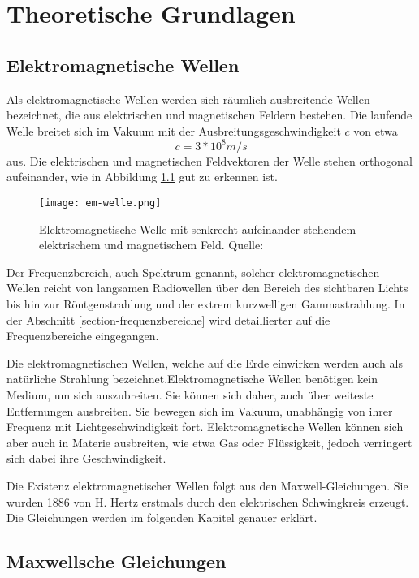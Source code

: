 
\chapter{Theoretische Grundlagen}
\section{Elektromagnetische Wellen}
Als elektromagnetische Wellen werden sich räumlich ausbreitende Wellen bezeichnet, die aus elektrischen und magnetischen Feldern bestehen. Die laufende Welle breitet sich im Vakuum mit der Ausbreitungsgeschwindigkeit \(c\) von etwa \[c= 3*10^8 m/s\] aus. Die elektrischen und magnetischen Feldvektoren der Welle stehen orthogonal aufeinander, wie in Abbildung \ref{elektromagnetische Welle} gut zu erkennen ist.

\begin{figure}[ht]
	\centering
	\texttt{[image: em-welle.png]}
	\caption[Elektromagnetische Welle mit senkrecht
	aufeinander stehendem elektrischem und magnetischem Feld]{Elektromagnetische Welle mit senkrecht aufeinander stehendem elektrischem und magnetischem Feld. Quelle: \cite[Harten, S. 130]{Harten:2017}} 
	\label{elektromagnetische Welle}
\end{figure}

Der Frequenzbereich, auch Spektrum genannt, solcher elektromagnetischen Wellen reicht von langsamen Radiowellen über den Bereich des sichtbaren Lichts bis hin zur Röntgenstrahlung und der extrem kurzwelligen Gammastrahlung. In der Abschnitt \ref{section-frequenzbereiche} wird detaillierter auf die Frequenzbereiche eingegangen.

Die elektromagnetischen Wellen, welche auf die Erde einwirken werden auch als natürliche Strahlung bezeichnet.Elektromagnetische Wellen benötigen kein Medium, um sich auszubreiten. Sie können sich daher, auch über weiteste Entfernungen ausbreiten. Sie bewegen sich im Vakuum, unabhängig von ihrer Frequenz mit Lichtgeschwindigkeit fort. Elektromagnetische Wellen können sich aber auch in Materie ausbreiten, wie etwa Gas oder Flüssigkeit, jedoch verringert sich dabei ihre Geschwindigkeit.

Die Existenz elektromagnetischer Wellen folgt aus den Maxwell-Gleichungen. Sie wurden 1886 von H. Hertz erstmals durch den elektrischen Schwingkreis erzeugt. Die Gleichungen werden im folgenden Kapitel genauer erklärt.

\section{Maxwellsche Gleichungen}

